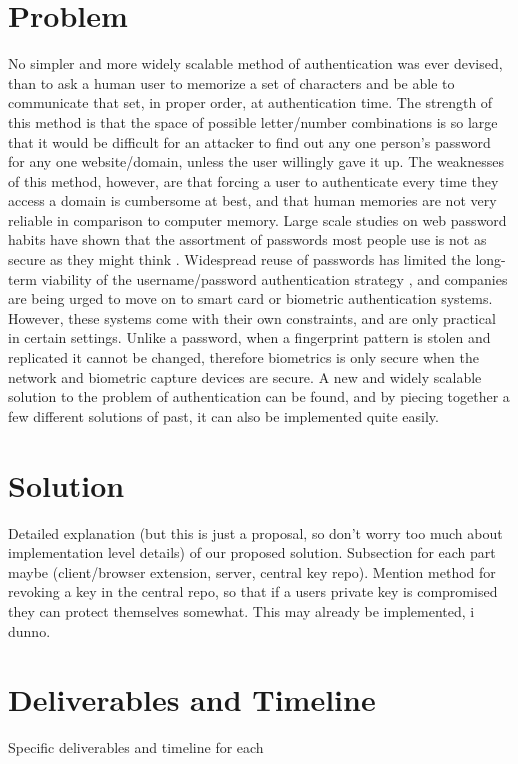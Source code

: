\documentclass[11pt]{article}   %
\begin{document}
\section{Problem} \label{sec:prob}
No simpler and more widely scalable method of authentication was ever devised, than to ask a human user to memorize a set of characters and be able to communicate that set, in proper order, at authentication time.  The strength of this method is that the space of possible letter/number combinations is so large that it would be difficult for an attacker to find out any one person's password for any one website/domain, unless the user willingly gave it up.  The weaknesses of this method, however, are that forcing a user to authenticate every time they access a domain is cumbersome at best, and that human memories are not very reliable in comparison to computer memory.  Large scale studies on web password habits have shown that the assortment of passwords most people use is not as secure as they might think \cite{habits}.  Widespread reuse of passwords has limited the long-term viability of the username/password authentication strategy \cite{domino}, and companies are being urged to move on to smart card or biometric authentication systems.  However, these systems come with their own constraints, and are only practical in certain settings. Unlike a password, when a fingerprint pattern is stolen and replicated it cannot be changed, therefore biometrics is only secure when the network and biometric capture devices are secure.  A new and widely scalable solution to the problem of authentication can be found, and by piecing together a few different solutions of past, it can also be implemented quite easily.  

\section{Solution} \label{sec:sol}
Detailed explanation (but this is just a proposal, so don't worry too much about implementation level details) of our proposed solution. Subsection for each part maybe (client/browser extension, server, central key repo).
Mention method for revoking a key in the central repo, so that if a users private key is compromised they can protect themselves somewhat. This may already be implemented, i dunno.

\section{Deliverables and Timeline} \label{sec:deliv}
Specific deliverables and timeline for each
\end{document}
